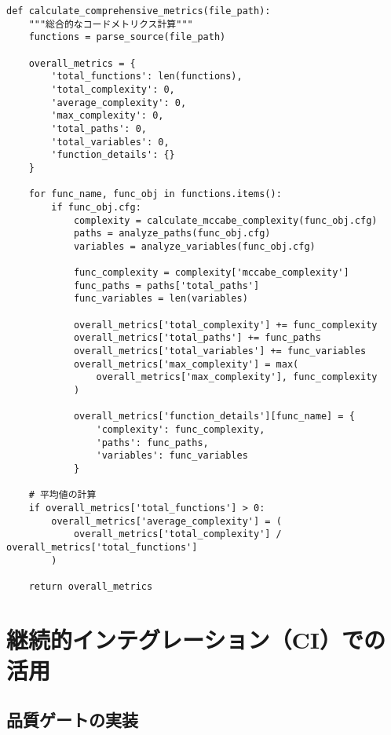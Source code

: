 \documentclass[12pt,a4paper]{article}
\begin{document}
\begin{lstlisting}[caption=総合的なコードメトリクス]
def calculate_comprehensive_metrics(file_path):
    """総合的なコードメトリクス計算"""
    functions = parse_source(file_path)

    overall_metrics = {
        'total_functions': len(functions),
        'total_complexity': 0,
        'average_complexity': 0,
        'max_complexity': 0,
        'total_paths': 0,
        'total_variables': 0,
        'function_details': {}
    }

    for func_name, func_obj in functions.items():
        if func_obj.cfg:
            complexity = calculate_mccabe_complexity(func_obj.cfg)
            paths = analyze_paths(func_obj.cfg)
            variables = analyze_variables(func_obj.cfg)

            func_complexity = complexity['mccabe_complexity']
            func_paths = paths['total_paths']
            func_variables = len(variables)

            overall_metrics['total_complexity'] += func_complexity
            overall_metrics['total_paths'] += func_paths
            overall_metrics['total_variables'] += func_variables
            overall_metrics['max_complexity'] = max(
                overall_metrics['max_complexity'], func_complexity
            )

            overall_metrics['function_details'][func_name] = {
                'complexity': func_complexity,
                'paths': func_paths,
                'variables': func_variables
            }

    # 平均値の計算
    if overall_metrics['total_functions'] > 0:
        overall_metrics['average_complexity'] = (
            overall_metrics['total_complexity'] / overall_metrics['total_functions']
        )

    return overall_metrics
\end{lstlisting}

\section{継続的インテグレーション（CI）での活用}

\subsection{品質ゲートの実装}
\end{document}

